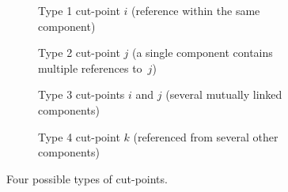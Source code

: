 \begin{figure}[t]
  \begin{subfigure}[b]{0.45\linewidth}
  \begin{center}
    
  \end{center}
  \caption{Type 1 cut-point $i$ (reference within the same component)}
  \label{fig:t1cutpoint}
  \end{subfigure}
  \hfill
  \begin{subfigure}[b]{0.45\linewidth}
  \begin{center}
    
  \end{center}
  \caption{Type 2 cut-point $j$ (a single component contains
    multiple references to~$j$)}
  \label{fig:t2cutpoint}
  \end{subfigure}

  \noindent
  \begin{subfigure}[b]{0.45\linewidth}
  \begin{center}
    
  \end{center}
  \caption{Type 3 cut-points $i$ and $j$ (several mutually linked components)}
  \label{fig:t3cutpoint}
  \end{subfigure}
  \hfill
  \begin{subfigure}[b]{0.45\linewidth}
  \begin{center}
    
  \end{center}
  \caption{Type 4 cut-point $k$ (referenced from several other components)}
  \label{fig:t4cutpoint}
  \end{subfigure}

  \caption{Four possible types of cut-points.}

  \label{fig:cptypes}

\end{figure}

